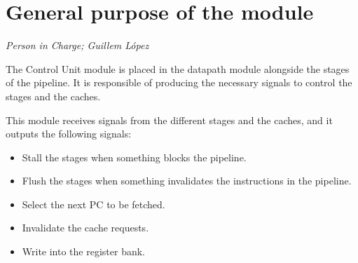 \newpage
\section{General purpose of the module}
\textit{Person in Charge; Guillem L\'opez}

The Control Unit module is placed in the datapath module alongside the stages of the pipeline.
It is responsible of producing the necessary signals to control the stages and the caches.

This module receives signals from the different stages and the caches, and it outputs the following signals:

\begin{itemize}
    \item Stall the stages when something blocks the pipeline.
    \item Flush the stages when something invalidates the instructions in the pipeline.
    \item Select the next PC to be fetched.
    \item Invalidate the cache requests.
    \item Write into the register bank.
\end{itemize}
